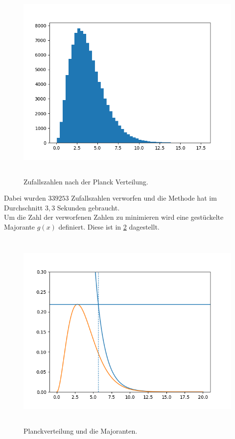 \begin{figure}
  \centering
  \includegraphics[height = 10cm]{plots/Histogramm.png}
  \caption{Zufallszahlen nach der Planck Verteilung.}
  \label{fig:Rechnung}
\end{figure}
Dabei wurden $339253$ Zufallszahlen verworfen und die Methode hat im Durchschnitt
$3,3$ Sekunden gebraucht.\\
Um die Zahl der verworfenen Zahlen zu minimieren wird eine gestückelte Majorante
$g(x)$ definiert. Diese ist in \ref{fig:Mayo} dagestellt.
\begin{figure}
  \centering
  \includegraphics[height = 10cm]{plots/Majoranten.png}
  \caption{Planckverteilung und die Majoranten.}
  \label{fig:Mayo}
\end{figure}
